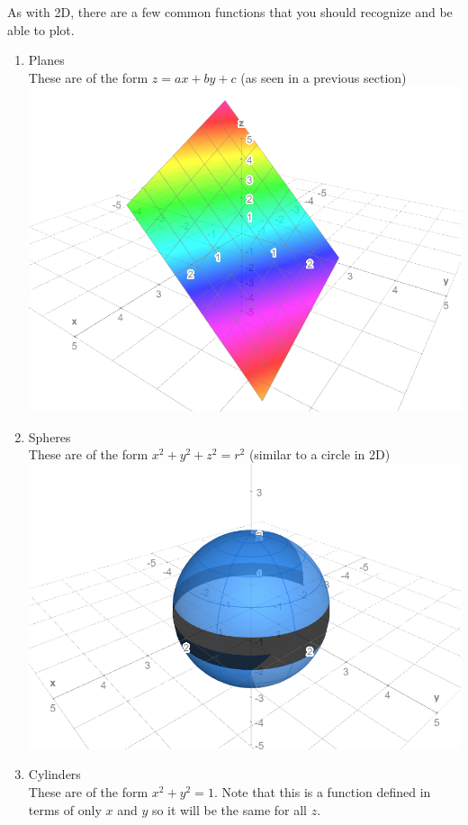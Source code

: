 As with 2D, there are a few common functions that you should recognize and be able to plot.
\begin{enumerate}
    \item Planes\\
    These are of the form $z=ax+by+c$ (as seen in a previous section)\\
    \includegraphics[scale=0.5]{Images/Math217Pictures/planeGraph.png}
    \item Spheres\\
    These are of the form $x^2+y^2+z^2=r^2$ (similar to a circle in 2D)\\
    \includegraphics[scale=0.5]{Images/Math217Pictures/sphereGraph.png}
    \item Cylinders\\
    These are of the form $x^2+y^2=1$. Note that this is a function defined in terms of only $x$ and $y$ so it will be the same for all $z$.\\

\end{enumerate}
